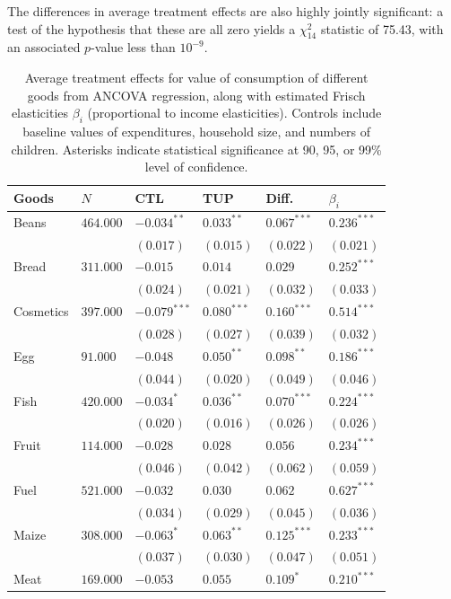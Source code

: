 \documentclass[11pt]{article}
\begin{document}
The differences in average treatment effects are also highly jointly
significant: a test of the hypothesis that these are all zero
yields a $\chi^2_{14}$ statistic of 75.43, with an associated
\(p\)-value less than $10^{-9}$.  

\begin{table}[htb]
\caption{\label{tab:goods_results}Average treatment effects for value of consumption of different goods from ANCOVA regression, along with estimated Frisch elasticities $\beta_i$ (proportional to income elasticities).  Controls include baseline values of expenditures, household size, and numbers of children.  Asterisks indicate statistical significance at 90, 95, or 99\% level of confidence.}
\centering
\begin{tabular}{llllll}
Goods & $N$ & CTL & TUP & Diff. & $\beta_i$\\
\hline
Beans & $464.000$ & $-0.034^{**}$ & $0.033^{**}$ & $0.067^{***}$ & $0.236^{***}$\\
 &  & $(0.017)$ & $(0.015)$ & $(0.022)$ & $(0.021)$\\
Bread & $311.000$ & $-0.015$ & $0.014$ & $0.029$ & $0.252^{***}$\\
 &  & $(0.024)$ & $(0.021)$ & $(0.032)$ & $(0.033)$\\
Cosmetics & $397.000$ & $-0.079^{***}$ & $0.080^{***}$ & $0.160^{***}$ & $0.514^{***}$\\
 &  & $(0.028)$ & $(0.027)$ & $(0.039)$ & $(0.032)$\\
Egg & $91.000$ & $-0.048$ & $0.050^{**}$ & $0.098^{**}$ & $0.186^{***}$\\
 &  & $(0.044)$ & $(0.020)$ & $(0.049)$ & $(0.046)$\\
Fish & $420.000$ & $-0.034^{*}$ & $0.036^{**}$ & $0.070^{***}$ & $0.224^{***}$\\
 &  & $(0.020)$ & $(0.016)$ & $(0.026)$ & $(0.026)$\\
Fruit & $114.000$ & $-0.028$ & $0.028$ & $0.056$ & $0.234^{***}$\\
 &  & $(0.046)$ & $(0.042)$ & $(0.062)$ & $(0.059)$\\
Fuel & $521.000$ & $-0.032$ & $0.030$ & $0.062$ & $0.627^{***}$\\
 &  & $(0.034)$ & $(0.029)$ & $(0.045)$ & $(0.036)$\\
Maize & $308.000$ & $-0.063^{*}$ & $0.063^{**}$ & $0.125^{***}$ & $0.233^{***}$\\
 &  & $(0.037)$ & $(0.030)$ & $(0.047)$ & $(0.051)$\\
Meat & $169.000$ & $-0.053$ & $0.055$ & $0.109^{*}$ & $0.210^{***}$\\

\end{tabular}
\end{table}
\end{document}
